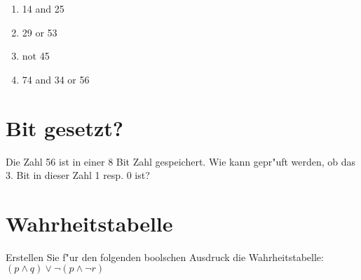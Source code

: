 \documentclass[a4paper,10pt]{article}
\begin{document}
\begin{enumerate}
\item 14 and 25
\item 29 or 53
\item not 45
\item 74 and 34 or 56
\end{enumerate}

\section{Bit gesetzt?}
Die Zahl 56 ist in einer 8 Bit Zahl gespeichert. Wie kann gepr"uft werden,
ob das 3. Bit in dieser Zahl 1 resp. 0 ist?

\section{Wahrheitstabelle}
Erstellen Sie f"ur den folgenden boolschen Ausdruck die Wahrheitstabelle:\\
$(p \land q) \lor \lnot(p \land \lnot r)$
\end{document}
